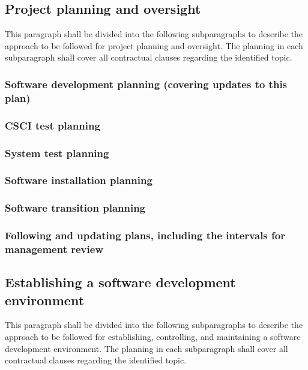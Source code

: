 \documentclass{fidata-report-template}
\begin{document}
\subsection{Project planning and oversight}

This paragraph shall be divided into the following subparagraphs to
describe the approach to be followed for project planning and oversight.
The planning in each subparagraph shall cover all contractual clauses
regarding the identified topic.

\subsubsection{Software development planning (covering updates to this
plan)}

\subsubsection{CSCI test planning}

\subsubsection{System test planning}

\subsubsection{Software installation planning}

\subsubsection{Software transition planning}

\subsubsection{Following and updating plans, including the intervals
for management review}

\subsection{Establishing a software development environment}

This paragraph shall be divided into the following subparagraphs to
describe the approach to be followed for establishing, controlling, and
maintaining a software development environment. The planning in each
subparagraph shall cover all contractual clauses regarding the
identified topic.
\end{document}
